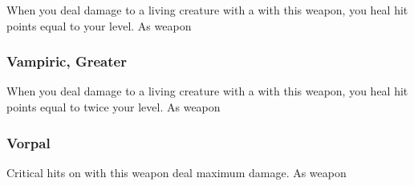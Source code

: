 When you deal damage to a living creature with a  with this weapon, you heal hit points equal to your level.
 
 As weapon
\lowercase{\hypertarget{item:Vampiric, Greater}{}}\label{item:Vampiric, Greater}
\hypertarget{item:Vampiric, Greater}{\subsubsection{Vampiric, Greater\hfill{}}}
When you deal damage to a living creature with a  with this weapon, you heal hit points equal to twice your level.
 
 As weapon
\lowercase{\hypertarget{item:Vorpal}{}}\label{item:Vorpal}
\hypertarget{item:Vorpal}{\subsubsection{Vorpal\hfill{}}}
Critical hits on  with this weapon deal maximum damage.
 
 As weapon